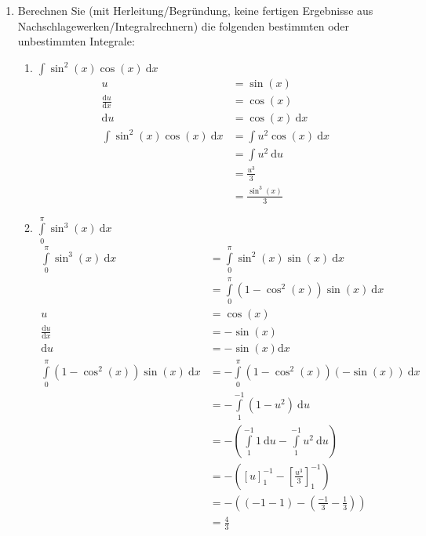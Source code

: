 \documentclass[10pt]{article}
\begin{document}

\noindent
\begin{enumerate}[start=5,leftmargin=1in]

    \item Berechnen Sie (mit Herleitung/Begründung, keine fertigen Ergebnisse aus 
    Nachschlagewerken/Integralrechnern) die folgenden bestimmten oder unbestimmten Integrale:
    \begin{enumerate}

        \item $\int \sin^2{(x)} \cos{(x)} \: \text{d}x$
        \begin{align*}
            u &= \sin(x) \\
            \frac{\text{d}u}{\text{d}x} &= \cos(x) \\
            \text{d}u &= \cos(x) \: \text{d}x \\ 
            \int \sin^2{(x)} \cos{(x)} \: \text{d}x &= \int u^2 \cos(x) \: \text{d}x \\
            &= \int u^2 \: \text{d}u \\
            &= \frac{u^3}{3} \\
            &= \frac{\sin^3(x)}{3}
        \end{align*}

        \item $\int\limits_{0}^{\pi} \sin^3(x) \: \text{d}x$
        \begin{align*}
            \int\limits_{0}^{\pi} \sin^3(x) \: \text{d}x &= \int\limits_{0}^{\pi} \sin^2(x) \sin(x) \: \text{d}x \\
            &= \int\limits_{0}^{\pi} (1 - \cos^2(x)) \sin(x) \: \text{d}x \\
            u &= \cos(x) \\
            \frac{\text{d}u}{\text{d}x} &= - \sin(x) \\
            \text{d}u &= - \sin(x) \text{d}x \\
            \int\limits_{0}^{\pi} (1 - \cos^2(x)) \sin(x) \: \text{d}x &= - \int\limits_{0}^{\pi} (1 - \cos^2(x)) (-\sin(x)) \: \text{d}x \\
            &= - \int\limits_{1}^{-1} (1 - u^2) \: \text{d}u \\
            &= - \left(\int\limits_{1}^{-1} 1 \: \text{d}u - \int\limits_{1}^{-1} u^2 \: \text{d}u\right) \\
            &= - \left(\left[u\right]_{1}^{-1} - \left[\frac{u^3}{3}\right]_{1}^{-1}\right) \\
            &= - \left((-1 - 1) - \left(\frac{-1}{3} - \frac{1}{3}\right)\right) \\
            &= \frac{4}{3}
        \end{align*}


\end{enumerate}
\end{enumerate}
\end{document}
